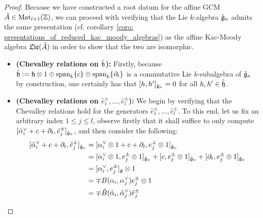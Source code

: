                 \begin{proof}
                    Because we have constructed a root datum for the affine GCM $\hat{A} \in \mathrm{Mat}_{l + 1}(\mathbb{Z})$, we can proceed with verifying that the Lie $k$-algebra $\hat{\mathfrak{g}}_{\kappa}$ admits the same presentation (cf. corollary \ref{coro: presentations_of_reduced_kac_moody_algebras}) as the affine Kac-Moody algebra $\mathfrak{Lie}(\hat{A})$ in order to show that the two are isomorphic.
                        \begin{itemize}
                            \item \textbf{(Chevalley relations on $\hat{\mathfrak{h}}$):} Firstly, because $\hat{\h} := \h \tensor 1 \oplus \span_k \{c\} \oplus \span_k \{\del_t\}$ is a commutative Lie $k$-subalgebra of $\hat{\mathfrak{g}}_{\kappa}$ by construction, one certainly has that $[h, h']_{\hat{\mathfrak{g}}_{\kappa}} = 0$ for all $h, h' \in \hat{\mathfrak{h}}$.
                            \item \textbf{(Chevalley relations on $\hat{e}_1^{\pm}, ..., \hat{e}_l^{\pm}$):} We begin by verifying that the Chevalley relations hold for the generators $\hat{e}_1^{\pm}, ..., \hat{e}_l^{\pm}$. To this end, let us fix an arbitrary index $1 \leq j \leq l$, observe firstly that it shall suffice to only compute $[\hat{\alpha}_i^{\vee} + c + \partial_t, \hat{e}_j^{\pm}]_{\hat{\mathfrak{g}}_{\kappa}}$, and then consider the following:
                                $$
                                    \begin{aligned}
                                        [\hat{\alpha}_i^{\vee} + c + \del_t, \hat{e}_j^{\pm}]_{\hat{\g}_{\kappa}} & = [\alpha_i^{\vee} \tensor 1 + c + \del_t, e_j^{\pm} \tensor 1 ]_{\hat{\g}_{\kappa}}
                                        \\
                                        & = [\alpha_i^{\vee} \tensor 1, e_j^{\pm} \tensor 1]_{\hat{\g}_{\kappa}} + [c, e_j^{\pm} \tensor 1]_{\hat{\g}_{\kappa}} + [\del_t, e_j^{\pm} \tensor 1]_{\hat{\g}_{\kappa}}
                                        \\
                                        & = [\alpha_i^{\vee}, e_j^{\pm}]_{\g} \tensor 1
                                        \\
                                        & = \mp B(\alpha_i, \alpha_j^{\vee}) e_j^{\pm} \tensor 1
                                        \\
                                        & = \mp \hat{B}(\hat{\alpha}_i, \hat{\alpha}_j^{\vee}) \hat{e}_j^{\pm}
                                    \end{aligned}
                                $$
                            

\end{itemize}
\end{proof}
